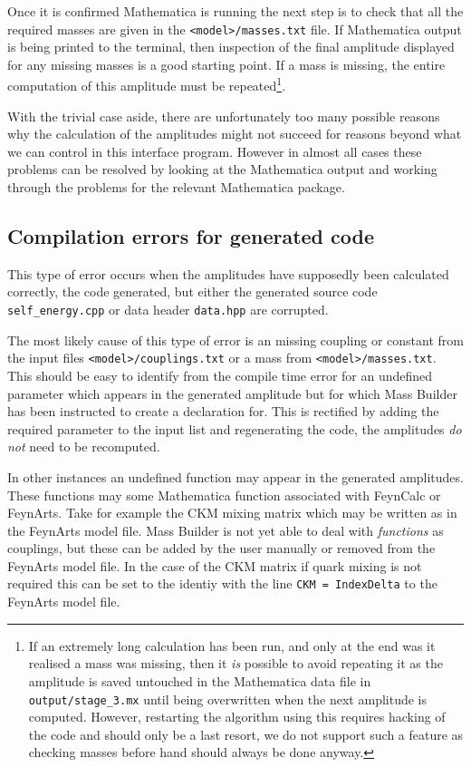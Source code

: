 Once it is confirmed Mathematica is running the next step is to check that all the required masses are given in the \lstinline{<model>/masses.txt} file.  If Mathematica output is being printed to the terminal, then inspection of the final amplitude displayed for any missing masses is a good starting point.  If a mass is missing, the entire computation of this amplitude must be repeated\footnote{If an extremely long calculation has been run, and only at the end was it realised a mass was missing, then it \textit{is} possible to avoid repeating it as the amplitude is saved untouched in the Mathematica data file in \lstinline{output/stage_3.mx} until being overwritten when the next amplitude is computed.  However, restarting the algorithm using this requires hacking of the code and should only be a last resort, we do not support such a feature as checking masses before hand should always be done anyway.}.


With the trivial case aside, there are unfortunately too many possible reasons why the calculation of the amplitudes might not succeed for reasons beyond what we can control in this interface program.  However in almost all cases these problems can be resolved by looking at the Mathematica output and working through the problems for the relevant Mathematica package.




\subsection{Compilation errors for generated code}

This type of error occurs when the amplitudes have supposedly been calculated correctly, the code generated, but either the generated source code \lstinline{self_energy.cpp} or data header \lstinline{data.hpp} are corrupted.

The most likely cause of this type of error is an missing coupling or constant from the input files \lstinline{<model>/couplings.txt} or a mass from \lstinline{<model>/masses.txt}.  This should be easy to identify from the compile time error for an undefined parameter which appears in the generated amplitude but for which Mass Builder has been instructed to create a declaration for.  This is rectified by adding the required parameter to the input list and regenerating the code, the amplitudes \textit{do not} need to be recomputed.

In other instances an undefined function may appear in the generated amplitudes.  These functions may some Mathematica function associated with FeynCalc or FeynArts.  Take for example the CKM mixing matrix which may be written as  in the FeynArts model file.  Mass Builder is not yet able to deal with \textit{functions} as couplings, but these can be added by the user manually or removed from the FeynArts model file.  In the case of the CKM matrix if quark mixing is not required this can be set to the identiy with the line \lstinline{CKM = IndexDelta} to the FeynArts model file.

